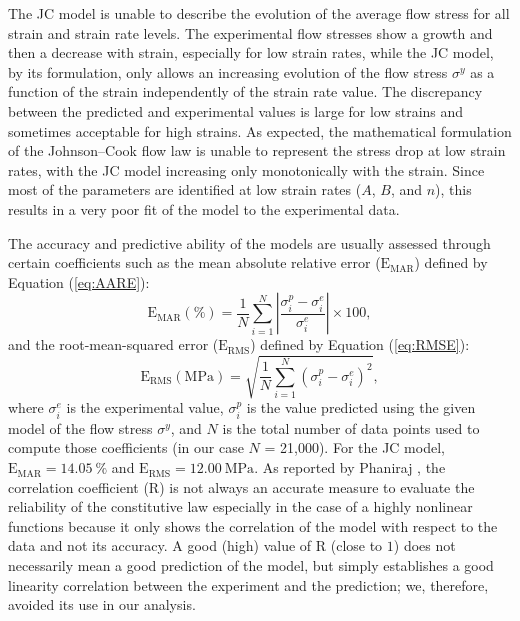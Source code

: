 \documentclass[metals,article,accept,pdftex,moreauthors]{Definitions/mdpi}
\DeclareRobustCommand{\RMSE}{\text{E}_\text{RMS}}
\DeclareRobustCommand{\MARE}{\text{E}_\text{MAR}}
\DeclareRobustCommand{\R}{\text{R}}
\DeclareRobustCommand{\MPa}{\text{MPa}}
\begin{document}
The JC model is unable to describe the evolution of the average flow stress for all strain and strain rate levels. The experimental flow stresses show a growth and then a decrease with strain, especially for low strain rates, while the JC model, by its formulation, only allows an increasing evolution of the flow stress $\sigma^y$ as a function of the strain independently of the strain rate value.
The discrepancy between the predicted and experimental values is large for low strains and sometimes acceptable for high strains.
As expected, the mathematical formulation of the Johnson--Cook flow law is unable to represent the stress drop at low strain rates, with the JC model increasing only monotonically with the strain.
Since most of the parameters are identified at low strain rates ($A$, $B$, and $n$), this results in a very poor fit of the model to the experimental data.

The accuracy and predictive ability of the models are usually assessed through certain coefficients such as the mean absolute relative error ($\MARE$) defined by Equation (\ref{eq:AARE}):
\begin{equation}
\MARE(\%) = \frac{1}{N} \sum_{i=1}^{N}{\left|\frac{\sigma_i^p -\sigma_i^e}{\sigma_i^e}\right|} \times 100, \label{eq:AARE}
\end{equation}
and the root-mean-squared error ($\RMSE$) defined by Equation (\ref{eq:RMSE}):
\begin{equation}
\RMSE (\MPa) = \sqrt{\frac{1}{N} \sum_{i=1}^{N} \left(\sigma_i^p - \sigma_i^e\right)^2}, \label{eq:RMSE}
\end{equation}
where $\sigma_i^e$ is the experimental value, $\sigma_i^p$ is the value predicted using the given model of the flow stress $\sigma^y$, and $N$ is the total number of data points used to compute those coefficients (in our case $N$ = 21,000).
For the JC model, $\MARE=14.05~\%$ and $\RMSE=12.00~\MPa$.
As reported by Phaniraj \cite{Phaniraj-2003}, the correlation coefficient ($\R$) is not always an accurate measure to evaluate the reliability of the constitutive law especially in the case of a highly nonlinear functions because it only shows the correlation of the model with respect to the data and not its accuracy.
A good (high) value of $\R$ (close to $1$) does not necessarily mean a good prediction of the model, but simply establishes a good linearity correlation between the experiment and the prediction; we, therefore, avoided its use in our analysis.

\end{document}
